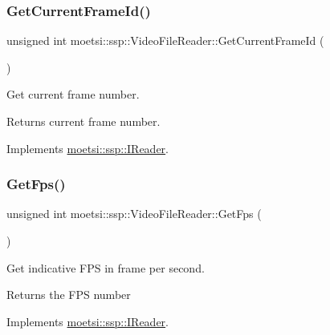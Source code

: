 \subsubsection{\texorpdfstring{Get\+Current\+Frame\+Id()}{GetCurrentFrameId()}}
{\footnotesize\ttfamily unsigned int moetsi\+::ssp\+::\+Video\+File\+Reader\+::\+Get\+Current\+Frame\+Id (\begin{DoxyParamCaption}{ }\end{DoxyParamCaption})\hspace{0.3cm}{\ttfamily [virtual]}}



Get current frame number. 

\begin{DoxyReturn}{Returns}
current frame number. 
\end{DoxyReturn}


Implements \hyperlink{classmoetsi_1_1ssp_1_1IReader_ac292d83eb06dee277baaa06e281a562d}{moetsi\+::ssp\+::\+I\+Reader}.

\mbox{\label{classmoetsi_1_1ssp_1_1VideoFileReader_a83359ad82898acdb75240568b182247c}} 
\subsubsection{\texorpdfstring{Get\+Fps()}{GetFps()}}
{\footnotesize\ttfamily unsigned int moetsi\+::ssp\+::\+Video\+File\+Reader\+::\+Get\+Fps (\begin{DoxyParamCaption}{ }\end{DoxyParamCaption})\hspace{0.3cm}{\ttfamily [virtual]}}



Get indicative F\+PS in frame per second. 

\begin{DoxyReturn}{Returns}
the F\+PS number 
\end{DoxyReturn}


Implements \hyperlink{classmoetsi_1_1ssp_1_1IReader_a9f6a8650ca290b011b8e5451eeae9f32}{moetsi\+::ssp\+::\+I\+Reader}.

\mbox{\label{classmoetsi_1_1ssp_1_1VideoFileReader_a9d47af47299c5fccf766ac2d848a561b}} 
